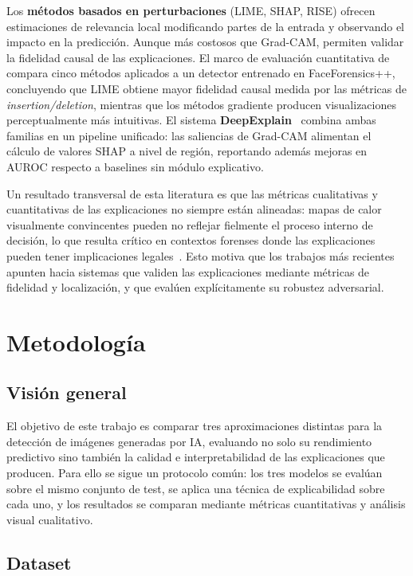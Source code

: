 \documentclass[12pt,a4paper,twoside]{article}
\begin{document}
Los \textbf{métodos basados en perturbaciones} (LIME, SHAP, RISE) ofrecen
estimaciones de relevancia local modificando partes de la entrada y observando el
impacto en la predicción. Aunque más costosos que Grad-CAM, permiten validar la
fidelidad causal de las explicaciones. El marco de evaluación cuantitativa de
\citeauthor{quant2024}~\cite{quant2024} compara cinco métodos aplicados a un
detector entrenado en FaceForensics++, concluyendo que LIME obtiene mayor fidelidad
causal medida por las métricas de \textit{insertion/deletion}, mientras que los
métodos gradiente producen visualizaciones perceptualmente más intuitivas. El
sistema \textbf{DeepExplain}~\cite{deepexplain2024} combina ambas familias en un
pipeline unificado: las saliencias de Grad-CAM alimentan el cálculo de valores SHAP
a nivel de región, reportando además mejoras en AUROC respecto a baselines sin
módulo explicativo.

Un resultado transversal de esta literatura es que las métricas cualitativas y
cuantitativas de las explicaciones no siempre están alineadas: mapas de calor
visualmente convincentes pueden no reflejar fielmente el proceso interno de
decisión, lo que resulta crítico en contextos forenses donde las explicaciones
pueden tener implicaciones legales~\cite{gradcam_medical}. Esto motiva que los
trabajos más recientes apunten hacia sistemas que validen las explicaciones mediante
métricas de fidelidad y localización, y que evalúen explícitamente su robustez
adversarial.

\section{Metodología}

\subsection{Visión general}

El objetivo de este trabajo es comparar tres aproximaciones distintas para la
detección de imágenes generadas por IA, evaluando no solo su rendimiento predictivo
sino también la calidad e interpretabilidad de las explicaciones que producen. Para
ello se sigue un protocolo común: los tres modelos se evalúan sobre el mismo
conjunto de test, se aplica una técnica de explicabilidad sobre cada uno, y los
resultados se comparan mediante métricas cuantitativas y análisis visual cualitativo.

\subsection{Dataset}
\end{document}
